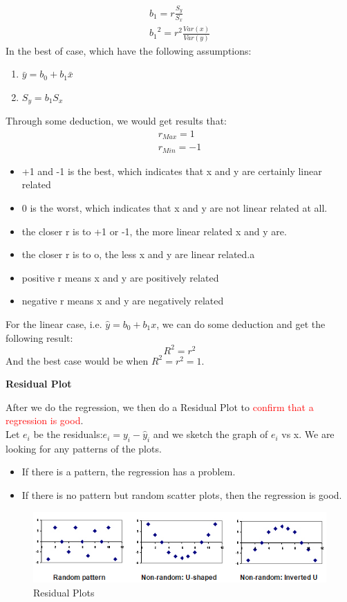 \begin{align}
    b_1=r\frac{S_y}{S_x}\\
    {b_1}^2=r^2\frac{Var(x)}{Var(y)}
\end{align}
In the best of case, which have the following assumptions:
\begin{enumerate}
    \item \(\bar{y}=b_0+b_1\bar{x}\)
    \item \(S_y=b_1S_x\)
\end{enumerate}
Through some deduction, we would get results that:
\begin{align}
    r_{Max}=1\\
    r_{Min}=-1
\end{align}
\begin{itemize}
    \item +1 and -1 is the best, which indicates that x and y are certainly linear related
    \item 0 is the worst, which indicates that x and y are not linear related at all.
    \item the closer r is to +1 or -1, the more linear related x and y are.
    \item the closer r is to o, the less x and y are linear related.a
    \item positive r means x and y are positively related
    \item negative r means x and y are negatively related
\end{itemize}
\vspace{6ex}
For the linear case, i.e. \(\hat{y}=b_0+b_1x\), we can do some deduction and get the following result:
\begin{equation}
    R^2=r^2
\end{equation}
And the best case would be when \(R^2=r^2=1\).
\vspace{6ex}
\begin{Center}
    \textbf{Residual Plot}
\end{Center}
After we do the regression, we then do a Residual Plot to \textcolor{red}{confirm that a regression is good}. \\
Let \(e_i\) be the residuals:\(e_i=y_i-\hat{y}_i\) and we sketch the graph of \(e_i\) vs x. We are looking for any patterns of the plots. 
\begin{itemize}
    \item If there is a pattern, the regression has a problem.
    \item If there is no pattern but random scatter plots, then the regression is good.
\end{itemize}
\begin{figure}[H]
    \centering
        \includegraphics[width=120mm]{residual.png}
        \caption{Residual Plots}
        \label{fig:my_label}
\end{figure}
